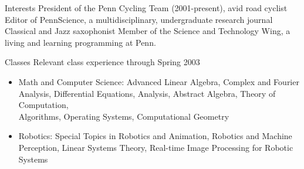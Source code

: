 \documentclass{resume}
\begin{document}
\begin{category}{Interests}
\citembullet President of the Penn Cycling Team (2001-present), avid road cyclist
\citembullet Editor of PennScience, a multidisciplinary, undergraduate research journal
\citembullet Classical and Jazz saxophonist
\citembullet Member of the Science and Technology Wing, a living and learning programming at Penn.
\end{category}




\begin{category}{Classes} 
\citembullet Relevant class experience through Spring 2003
\begin{itemize}
        \item Math and Computer Science: Advanced Linear Algebra, Complex and Fourier Analysis, Differential Equations, Analysis, Abstract Algebra, Theory of Computation,\\ Algorithms, Operating Systems, Computational Geometry
        \item Robotics: Special Topics in Robotics and Animation, Robotics and Machine \\ Perception, Linear Systems Theory, Real-time Image Processing for Robotic Systems
\end{itemize}
\end{category}
\end{document}
